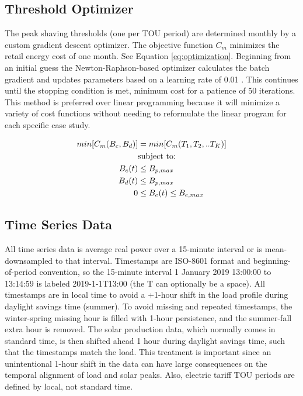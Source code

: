 \documentclass[conference]{IEEEtran}
\begin{document}
\subsection{Threshold Optimizer}

The peak shaving thresholds (one per TOU period) are determined monthly by a custom gradient descent optimizer. The objective function \(C_m\) minimizes the retail energy cost of one month. See Equation \ref{eq:optimization}. Beginning from an initial guess the Newton-Raphson-based optimizer calculates the batch gradient and updates parameters based on a learning rate of 0.01 \cite{Truong2019}. This continues until the stopping condition is met, minimum cost for a patience of 50 iterations. This method is preferred over linear programming because it will minimize a variety of cost functions without needing to reformulate the linear program for each specific case study.

\begin{align}
    min[C_m(B_c,B_d)] & = min[C_m(T_1,T_2,..T_K)] \label{eq:optimization} \\
                      & \text{subject to: } \notag \\
    B_c(t)            & \le B_{p,max}  \\
    B_d(t)            & \le B_{p,max}  \\
    0         & \le B_{e}(t) \le B_{e,max} 
\end{align}

\subsection{Time Series Data}

All time series data is average real power over a 15-minute interval or is mean-downsampled to that interval. Timestamps are ISO-8601 format and beginning-of-period convention, so the 15-minute interval 1 January 2019 13:00:00 to 13:14:59 is labeled 2019-1-1T13:00 (the T can optionally be a space). All timestamps are in local time to avoid a +1-hour shift in the load profile during daylight savings time (summer). To avoid missing and repeated timestamps, the winter-spring missing hour is filled with 1-hour persistence, and the summer-fall extra hour is removed. The solar production data, which normally comes in standard time, is then shifted ahead 1 hour during daylight savings time, such that the timestamps match the load. This treatment is important since an unintentional 1-hour shift in the data can have large consequences on the temporal alignment of load and solar peaks. Also, electric tariff TOU periods are defined by local, not standard time. 
\end{document}
